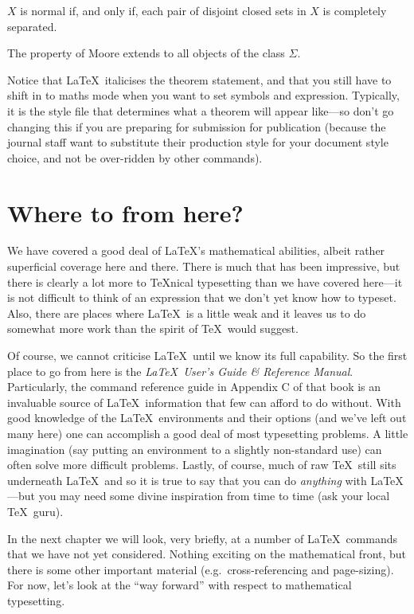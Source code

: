 \begin{thm} $X$ is normal if, and only if, each pair of disjoint
closed sets in $X$ is completely separated.
\end{thm}

\begin{wildshot}
The property of Moore extends to all objects of the class $\Sigma$.
\end{wildshot}

Notice that \LaTeX\ italicises the theorem statement, and that you
still have to shift in to maths mode when you want to set symbols
and expression.  Typically, it is the style file that determines
what a theorem will appear like---so don't go changing this if
you are preparing for submission for publication (because the journal
staff want to substitute their production style for your document style
choice, and not be over-ridden by other commands).

\section{Where to from here?}
We have covered a good deal of \LaTeX's mathematical abilities, 
albeit rather superficial coverage here and there.  There is
much that has been impressive, but there is clearly a lot more
to {\TeX}nical typesetting than we have covered here---it is
not difficult to think of an expression that we don't yet know
how to typeset.  Also, there are places where \LaTeX\ is a
little weak and it leaves us to do somewhat more work than
the spirit of \TeX\ would suggest.

Of course, we cannot criticise \LaTeX\ until we know its full
capability.  So the first place to go from here is the
{\em\LaTeX\ User's Guide \& Reference Manual}.  Particularly, the
command reference guide in Appendix C of that book is an
invaluable source of \LaTeX\ information that few can afford to 
do without.  With good knowledge of the \LaTeX\ environments and their
options (and we've left out many here) one can accomplish a good
deal of most typesetting problems.  A little imagination (say
putting an environment to a slightly non-standard use) can often
solve more difficult problems.  Lastly, of course, much of
raw \TeX\ still sits underneath \LaTeX\ and so it is true to say that
you can do {\em anything\/} with \LaTeX---but you may need some
divine inspiration from time to time (ask your local \TeX\ guru).

In the next chapter we will look, very briefly, at a number of
\LaTeX\ commands that we have not yet considered.  Nothing
exciting on the mathematical front, but there is some other
important material (e.g.\ cross-referencing and page-sizing).
For now, let's look at the ``way forward'' with respect to 
mathematical typesetting.


